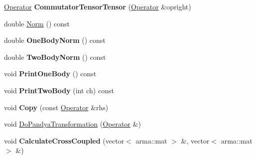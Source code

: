 \begin{DoxyCompactItemize}
\item 
\hypertarget{classOperator_aa6234e3c9b20635d32a082d74d45412b}{\hyperlink{classOperator}{Operator} {\bfseries Commutator\-Tensor\-Tensor} (\hyperlink{classOperator}{Operator} \&opright)}\label{classOperator_aa6234e3c9b20635d32a082d74d45412b}

\item 
double \hyperlink{classOperator_acb9d7959232a636191b91f6bf5b7b0c8}{Norm} () const 
\item 
\hypertarget{classOperator_a72dc7aea85c7775097d235de6f17f330}{double {\bfseries One\-Body\-Norm} () const }\label{classOperator_a72dc7aea85c7775097d235de6f17f330}

\item 
\hypertarget{classOperator_af1c40bdef64ec9abd5d95e8328565a67}{double {\bfseries Two\-Body\-Norm} () const }\label{classOperator_af1c40bdef64ec9abd5d95e8328565a67}

\item 
\hypertarget{classOperator_a5ec5a8110337108ac31d3af7337e454b}{void {\bfseries Print\-One\-Body} () const }\label{classOperator_a5ec5a8110337108ac31d3af7337e454b}

\item 
\hypertarget{classOperator_a905e42cefafaca0eb155cf41b3cd37b8}{void {\bfseries Print\-Two\-Body} (int ch) const }\label{classOperator_a905e42cefafaca0eb155cf41b3cd37b8}

\item 
\hypertarget{classOperator_a851708e76dd24603d0527f6c5c1bd544}{void {\bfseries Copy} (const \hyperlink{classOperator}{Operator} \&rhs)}\label{classOperator_a851708e76dd24603d0527f6c5c1bd544}

\item 
void \hyperlink{classOperator_a41c7174d15a89edcf9a963e686e5da92}{Do\-Pandya\-Transformation} (\hyperlink{classOperator}{Operator} \&)
\item 
\hypertarget{classOperator_aa9082f11f4b3aaf4bb08c058c4dca707}{void {\bfseries Calculate\-Cross\-Coupled} (vector$<$ arma\-::mat $>$ \&, vector$<$ arma\-::mat $>$ \&)}\label{classOperator_aa9082f11f4b3aaf4bb08c058c4dca707}


\end{DoxyCompactItemize}
